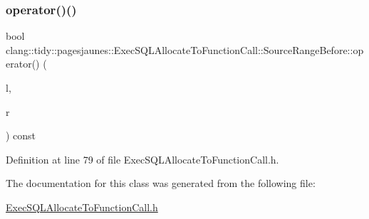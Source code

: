 \subsubsection{\texorpdfstring{operator()()}{operator()()}}
{\footnotesize\ttfamily bool clang\+::tidy\+::pagesjaunes\+::\+Exec\+S\+Q\+L\+Allocate\+To\+Function\+Call\+::\+Source\+Range\+Before\+::operator() (\begin{DoxyParamCaption}\item[{const \hyperlink{classclang_1_1tidy_1_1pagesjaunes_1_1_exec_s_q_l_allocate_to_function_call_1_1_source_range_for_string_literals}{Source\+Range\+For\+String\+Literals} \&}]{l,  }\item[{const \hyperlink{classclang_1_1tidy_1_1pagesjaunes_1_1_exec_s_q_l_allocate_to_function_call_1_1_source_range_for_string_literals}{Source\+Range\+For\+String\+Literals} \&}]{r }\end{DoxyParamCaption}) const\hspace{0.3cm}{\ttfamily [inline]}}



Definition at line 79 of file Exec\+S\+Q\+L\+Allocate\+To\+Function\+Call.\+h.



The documentation for this class was generated from the following file\+:\begin{DoxyCompactItemize}
\item 
\hyperlink{_exec_s_q_l_allocate_to_function_call_8h}{Exec\+S\+Q\+L\+Allocate\+To\+Function\+Call.\+h}\end{DoxyCompactItemize}
